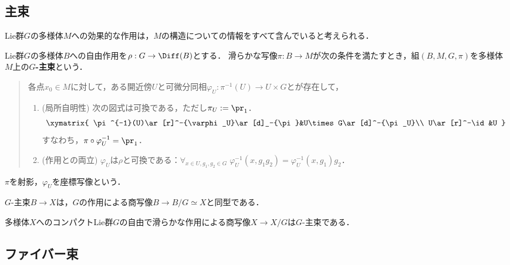 \documentclass[uplatex,dvipdfmx]{jsreport}
\begin{document}
\subsection{主束}

\begin{tcolorbox}[colframe=ForestGreen, colback=ForestGreen!10!white,breakable,colbacktitle=ForestGreen!40!white,coltitle=black,fonttitle=\bfseries\sffamily,
title=]
    Lie群$G$の多様体$M$への効果的な作用は，$M$の構造についての情報をすべて含んでいると考えられる．
\end{tcolorbox}

\begin{definition}
    Lie群$G$の多様体$B$への自由作用を$\rho:G\to\Diff(B)$とする．
    滑らかな写像$\pi:B\to M$が次の条件を満たすとき，組$(B,M,G,\pi)$を多様体$M$上の\textbf{$G$-主束}という．
    \begin{quote}
        各点$x_0\in M$に対して，ある開近傍$U$と可微分同相$\varphi_U:\pi^{-1}(U)\to U\times G$とが存在して，
        \begin{enumerate}
            \item (局所自明性) 次の図式は可換である，ただし$\pi_U:=\pr_1$．
            \[\xymatrix{
                \pi^{-1}(U)\ar[r]^-{\varphi_U}\ar[d]_-{\pi}&U\times G\ar[d]^-{\pi_U}\\
                U\ar[r]^-\id&U
            }\]
            すなわち，$\pi\circ\varphi_U^{-1}=\pr_1$．
            \item (作用との両立) $\varphi_U$は$\rho$と可換である：$\forall_{x\in U,g_1,g_2\in G}\;\varphi_U^{-1}(x,g_1g_2)=\varphi_U^{-1}(x,g_1)g_2$．
        \end{enumerate}
    \end{quote}
    $\pi$を射影，$\varphi_U$を座標写像という．
\end{definition}

\begin{proposition}
    $G$-主束$B\to X$は，$G$の作用による商写像$B\to B/G\simeq X$と同型である．
\end{proposition}

\begin{proposition}
    多様体$X$へのコンパクトLie群$G$の自由で滑らかな作用による商写像$X\to X/G$は$G$-主束である．
\end{proposition}

\subsection{ファイバー束}
\end{document}
